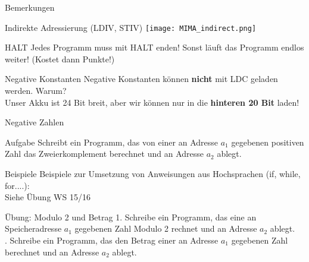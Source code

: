 \begin{frame}{Bemerkungen}
	\begin{block}{Indirekte Adressierung (LDIV, STIV)}
		\centering
		\texttt{[image: MIMA\_indirect.png]}
	\end{block}
	
	\pause
	\begin{block}{HALT}
		Jedes Programm muss mit HALT enden! Sonst läuft das Programm endlos weiter! (Kostet dann Punkte!)
	\end{block}

	\pause
	\begin{block}{Negative Konstanten}
		Negative Konstanten können \textbf{nicht} mit LDC geladen werden. Warum? \\
		\pause \impl Unser Akku ist 24 Bit breit, aber wir können nur in die \textbf{hinteren 20 Bit} laden!
	\end{block}
\end{frame}

\begin{frame}{Negative Zahlen}
	\begin{block}{Aufgabe}
		Schreibt ein Programm, das von einer an Adresse $a_1$ gegebenen positiven Zahl das Zweierkomplement berechnet und an Adresse $a_2$ ablegt.
	\end{block}

\end{frame}

\begin{frame}{Beispiele}
	Beispiele zur Umsetzung von Anweisungen aus Hochsprachen (if, while, for....):\\
	Siehe Übung WS 15/16
\end{frame}

\begin{frame}{Übung: Modulo 2 und Betrag}
	1. Schreibe ein Programm, das eine an Speicheradresse $a_1$ gegebenen Zahl Modulo 2 rechnet und an Adresse $a_2$ ablegt. \\
	. Schreibe ein Programm, das den Betrag einer an Adresse $a_1$ gegebenen Zahl berechnet und an Adresse $a_2$ ablegt.
\end{frame}

